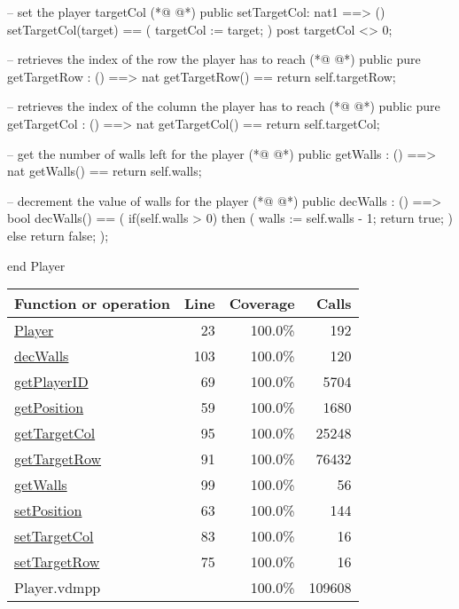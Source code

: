 \begin{vdmpp}[breaklines=true]
   -- set the player targetCol
(*@
\label{setTargetCol:83}
@*)
   public setTargetCol: nat1 ==> ()
   setTargetCol(target) ==
   (
    targetCol := target;
   )
   post targetCol <> 0;
   
   -- retrieves the index of the row the player has to reach
(*@
\label{getTargetRow:91}
@*)
   public pure getTargetRow : () ==> nat
   getTargetRow() == return self.targetRow;
   
   -- retrieves the index of the column the player has to reach
(*@
\label{getTargetCol:95}
@*)
   public pure getTargetCol : () ==> nat
   getTargetCol() == return self.targetCol;

   -- get the number of walls left for the player
(*@
\label{getWalls:99}
@*)
   public getWalls : () ==> nat
   getWalls() == return self.walls;
   
   -- decrement the value of walls for the player
(*@
\label{decWalls:103}
@*)
   public decWalls : () ==> bool
   decWalls() ==
   (
    if(self.walls > 0)
    then 
    (
     walls := self.walls - 1;
     return true;
    )
    else return false;
   );
   
end Player
\end{vdmpp}
\bigskip
\begin{longtable}{|l|r|r|r|}
\hline
Function or operation & Line & Coverage & Calls \\
\hline
\hline
\hyperref[Player:23]{Player} & 23&100.0\% & 192 \\
\hline
\hyperref[decWalls:103]{decWalls} & 103&100.0\% & 120 \\
\hline
\hyperref[getPlayerID:69]{getPlayerID} & 69&100.0\% & 5704 \\
\hline
\hyperref[getPosition:59]{getPosition} & 59&100.0\% & 1680 \\
\hline
\hyperref[getTargetCol:95]{getTargetCol} & 95&100.0\% & 25248 \\
\hline
\hyperref[getTargetRow:91]{getTargetRow} & 91&100.0\% & 76432 \\
\hline
\hyperref[getWalls:99]{getWalls} & 99&100.0\% & 56 \\
\hline
\hyperref[setPosition:63]{setPosition} & 63&100.0\% & 144 \\
\hline
\hyperref[setTargetCol:83]{setTargetCol} & 83&100.0\% & 16 \\
\hline
\hyperref[setTargetRow:75]{setTargetRow} & 75&100.0\% & 16 \\
\hline
\hline
Player.vdmpp & & 100.0\% & 109608 \\
\hline
\end{longtable}

